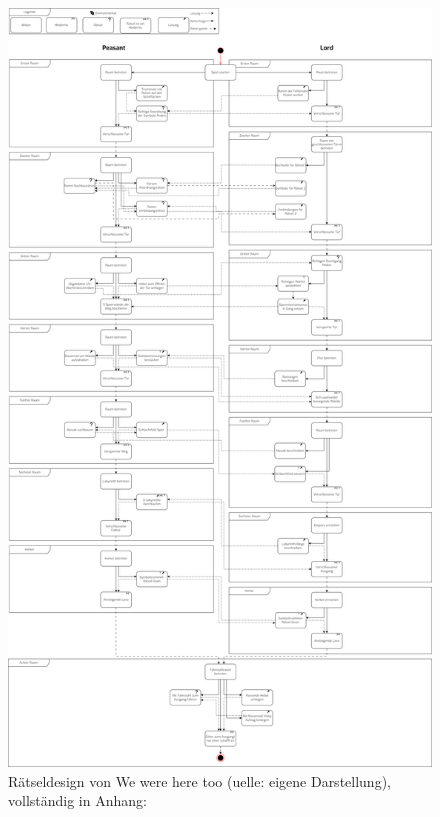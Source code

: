 \begin{figure}[ht]
\centering
\includegraphics[width=0.8\linewidth]{content/pictures/WeWereHereTooUML.png}
\caption{Rätseldesign von We were here too (uelle: eigene Darstellung), vollständig in Anhang: }
\label{fig:wwht-uml}
\end{figure}

